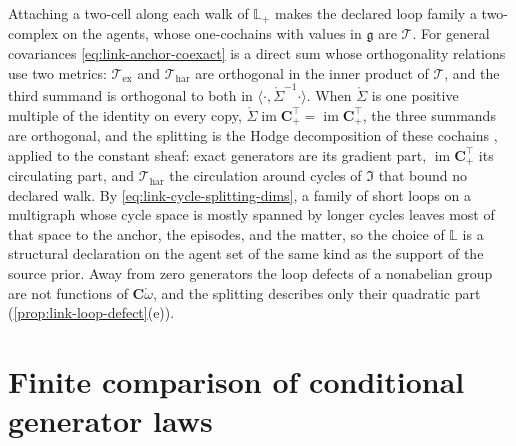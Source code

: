 Attaching a two-cell along each walk of $\mathbb L_+$ makes the declared loop family a two-complex on
the agents, whose one-cochains with values in $\mathfrak g$ are $\mathscr T$. For general covariances
\eqref{eq:link-anchor-coexact} is a direct sum whose orthogonality relations use two metrics: $\mathscr T_{\mathrm{ex}}$
and $\mathscr T_{\mathrm{har}}$ are orthogonal in the inner product of $\mathscr T$, and the third summand is
orthogonal to both in $\langle\cdot,\mathring\Sigma^{-1}\cdot\rangle$. When $\mathring\Sigma$ is one positive
multiple of the identity on every copy, $\mathring\Sigma\operatorname{im}\mathbf C_+^\top=\operatorname{im}\mathbf C_+^\top$,
the three summands are orthogonal, and the splitting is the Hodge decomposition of these cochains
\citep[Theorem~3.1]{HansenGhrist2019}, applied to the constant sheaf: exact generators are its gradient
part, $\operatorname{im}\mathbf C_+^\top$ its circulating part, and $\mathscr T_{\mathrm{har}}$ the circulation
around cycles of $\mathfrak I$ that bound no declared walk. By \eqref{eq:link-cycle-splitting-dims}, a family of short loops on a multigraph whose
cycle space is mostly spanned by longer cycles leaves most of that space to the anchor, the episodes,
and the matter, so the choice of $\mathbb L$ is a structural declaration on the agent set of the same
kind as the support of the source prior. Away from zero generators the loop defects of a nonabelian
group are not functions of $\mathbf C\mathring\omega$, and the splitting describes only their quadratic part
(\cref{prop:link-loop-defect}(e)).

\section{Finite comparison of conditional generator laws}
\label{sec:link-finite-native-comparison}

